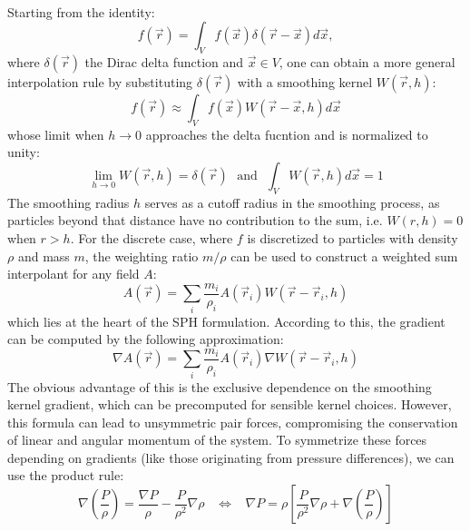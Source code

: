 \documentclass{llncs}
\begin{document}
\paragraph{} Starting from the identity:
\begin{equation*}
  f(\vec{r}) = \int_Vf(\vec{x}) \delta(\vec{r} - \vec{x}) d\vec{x},
\end{equation*}
where $\delta(\vec{r})$ the Dirac delta function and $\vec{x} \in V$, one can obtain a
more general interpolation rule by substituting $\delta(\vec{r})$ with a smoothing kernel
$W(\vec{r}, h)$:
\begin{equation*}
  \label{eq:c-approx}
  f(\vec{r}) \approx \int_V f(\vec{x}) W(\vec{r}-\vec{x}, h) d\vec{x}
\end{equation*}
whose limit when $h\to0$ approaches the delta fucntion and is normalized to unity:
\begin{equation*}
  \label{eq:kernel-properties}
  \lim_{h\to0}W(\vec{r}, h) = \delta(\vec{r})\ \ \
  \text{and}\ \ \
  \int_VW(\vec{r}, h) d\vec{x} = 1
\end{equation*}
The smoothing radius $h$ serves as a cutoff radius in the smoothing process, as particles
beyond that distance have no contribution to the sum, i.e. $W(r,h) = 0$ when $r>h$. For
the discrete case, where $f$ is discretized to particles with density $\rho$ and mass $m$,
the weighting ratio $m/\rho$ can be used to construct a weighted sum interpolant for any
field $A$:
\begin{equation}
  \label{eq:d-approx}
  A(\vec{r}) = \sum_i \frac{m_i}{\rho_i} A(\vec{r}_i) W(\vec{r}-\vec{r}_i, h)
\end{equation}
which lies at the heart of the SPH formulation. According to this, the gradient can be
computed by the following approximation:
\begin{equation}
  \label{eq:d-grad}
  \nabla A(\vec{r}) = \sum_i \frac{m_i}{\rho_i} A(\vec{r}_i) \nabla W(\vec{r} - \vec{r}_i, h)
\end{equation}
The obvious advantage of this is the exclusive dependence on the smoothing kernel
gradient, which can be precomputed for sensible kernel choices. However, this formula can
lead to unsymmetric pair forces, compromising the conservation of linear and angular
momentum of the system. To symmetrize these forces depending on gradients (like those
originating from pressure differences), we can use the product rule:
\begin{equation*}
  \label{eq:grad-identity}
  \nabla \left( \frac{P}{\rho} \right) =
  \frac{\nabla P}{\rho}-
  \frac{P}{\rho^2} \nabla \rho
  \hspace{10pt} \Leftrightarrow \hspace{10pt}
  \nabla P = \rho \left[ \frac{P}{\rho^2} \nabla \rho + \nabla \left( \frac{P}{\rho}
    \right) \right]
\end{equation*}
\end{document}
